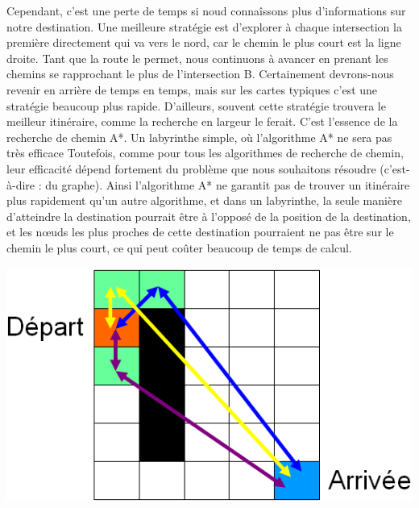 \documentclass[a4paper,12pt]{article} %
\begin{document}
Cependant, c'est une perte de temps si noud connaîssons plus d'informations sur notre destination. Une meilleure stratégie est d'explorer à chaque intersection la première directement qui va vers le nord, car le chemin le plus court est la ligne droite. Tant que la route le permet, nous continuons à avancer en prenant les chemins se rapprochant le plus de l'intersection B. Certainement devrons-nous revenir en arrière de temps en temps, mais sur les cartes typiques c'est une stratégie beaucoup plus rapide. D'ailleurs, souvent cette stratégie trouvera le meilleur itinéraire, comme la recherche en largeur le ferait. C'est l'essence de la recherche de chemin A*.
Un labyrinthe simple, où l'algorithme A* ne sera pas très efficace
\newline
Toutefois, comme pour tous les algorithmes de recherche de chemin, leur efficacité dépend fortement du problème que nous souhaitons résoudre (c'est-à-dire : du graphe). Ainsi l'algorithme A* ne garantit pas de trouver un itinéraire plus rapidement qu'un autre algorithme, et dans un labyrinthe, la seule manière d'atteindre la destination pourrait être à l'opposé de la position de la destination, et les nœuds les plus proches de cette destination pourraient ne pas être sur le chemin le plus court, ce qui peut coûter beaucoup de temps de calcul.
\newline
\begin{center} \includegraphics[scale=0.30]{astar.png} \end{center}
\end{document}
